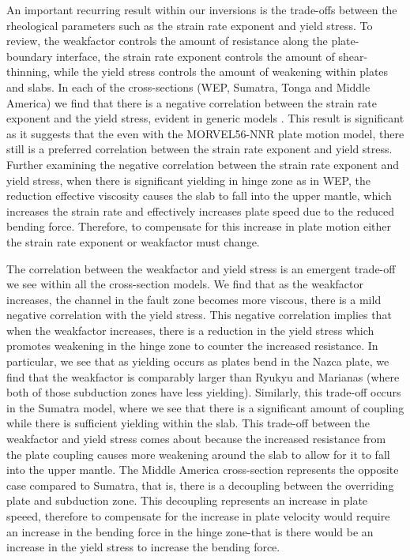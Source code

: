 \documentclass[12pt]{article}
\begin{document}
{  An important recurring result within our inversions is the trade-offs between the rheological parameters such as the strain rate exponent and yield stress. To review, the weakfactor controls the amount of resistance along the plate-boundary  interface, the strain rate exponent controls the amount of shear-thinning, while the yield stress controls the amount of weakening within plates and slabs. In each of the cross-sections (WEP, Sumatra, Tonga and Middle America) we find that there is a negative correlation between the strain rate exponent and the yield stress, evident in generic models \citep{ratnaswamy2015adjoint}. This result is significant as it suggests that the even with the MORVEL56-NNR plate motion model, there still is a preferred correlation between the strain rate exponent and yield stress. Further examining the negative correlation between the strain rate exponent and yield stress, when there is significant yielding in hinge zone as in WEP, the reduction effective viscosity causes the slab to fall into the upper mantle, which increases the strain rate and effectively increases plate speed due to the reduced bending force. Therefore, to compensate for this increase in plate motion either the strain rate exponent or weakfactor must change.
  
  The correlation between the weakfactor and yield stress is an emergent trade-off we see within all the cross-section models. We find that as the weakfactor increases, the channel in the fault zone becomes more viscous, there is a mild negative correlation with the yield stress. This negative correlation implies that when the weakfactor increases, there is a reduction in the yield stress which promotes weakening in the hinge zone to counter the increased resistance. In particular, we see that as yielding occurs as plates bend in the Nazca plate, we find that the weakfactor is comparably larger than Ryukyu and Marianas (where both of those subduction zones have less yielding). Similarly, this trade-off occurs in the Sumatra model, where we see that there is a significant amount of coupling while there is sufficient yielding within the slab. This trade-off between the weakfactor and yield stress comes about because the increased resistance from the plate coupling causes more weakening around the slab to allow for it to fall into the upper mantle.  The Middle America cross-section represents the opposite case compared to Sumatra, that is, there is a decoupling between the overriding plate and subduction zone. This decoupling represents an increase in plate speeed, therefore to compensate for the increase in plate velocity would require an increase in the bending force in the hinge zone-that is there would be an increase in the yield stress to increase the bending force.
  
}
\end{document}
